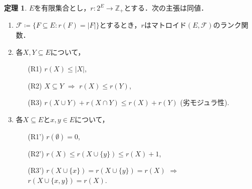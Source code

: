 \documentclass[xelatex,ja=standard,a4paper,14pt,everyparhook=compat]{bxjsarticle}
\newcommand{\bbZ}{\mathbb{Z}}
\theoremstyle{definition}
\newtheorem{theorem}{定理}[subsection]
\begin{document}
\begin{theorem}
    $E$を有限集合とし，$r : 2^E \to \bbZ_+$とする．次の主張は同値． \begin{enumerate}
        \item $\mathcal{F} \coloneqq \{F \subseteq E : r(F) = |F|\}$とするとき，$r$はマトロイド$(E, \mathcal{F})$のランク関数．
        \item 各$X, Y \subseteq E$について， \begin{enumerate}
                  \item[(R1)] $r(X) \leq |X|$,
                  \item[(R2)] $X \subseteq Y$ $\Longrightarrow$ $r(X) \leq r(Y)$,
                  \item[(R3)] $r(X \cup Y) + r(X \cap Y) \leq r(X) + r(Y)$ (劣モジュラ性).
              \end{enumerate}
        \item 各$X \subseteq E$と$x,y \in E$について， \begin{enumerate}
                  \item[(R1')] $r(\emptyset) = 0$,
                  \item[(R2')] $r(X) \leq r(X \cup \{y\}) \leq r(X) + 1$,
                  \item[(R3')] $r(X \cup \{x\}) = r(X \cup \{y\}) = r(X)$ $\Longrightarrow$ $r(X \cup \{x,y\}) = r(X)$.
              \end{enumerate}
    \end{enumerate}
\end{theorem}
\end{document}
